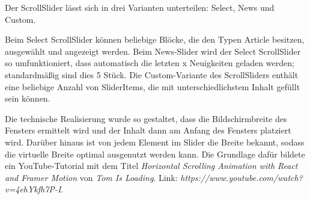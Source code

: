 Der ScrollSlider lässt sich in drei Varianten unterteilen: Select, News und Custom.

Beim Select ScrollSlider können beliebige Blöcke, die den Typen Article besitzen, ausgewählt und angezeigt werden.
Beim News-Slider wird der Select ScrollSlider so umfunktioniert, dass automatisch die letzten x Neuigkeiten geladen werden; standardmäßig sind dies 5 Stück.
Die Custom-Variante des ScrollSliders enthält eine beliebige Anzahl von SliderItems, die mit unterschiedlichstem Inhalt gefüllt sein können.

Die technische Realisierung wurde so gestaltet, dass die Bildschirmbreite des Fensters ermittelt wird und der Inhalt dann am Anfang des Fensters platziert wird. 
Darüber hinaus ist von jedem Element im Slider die Breite bekannt, sodass die virtuelle Breite optimal ausgenutzt werden kann. 
Die Grundlage dafür bildete ein YouTube-Tutorial mit dem Titel \emph{Horizontal Scrolling Animation with React and Framer Motion} von \emph{Tom Is Loading}. Link: \emph{https://www.youtube.com/watch?v=4ehYkfh7P-I}. 

